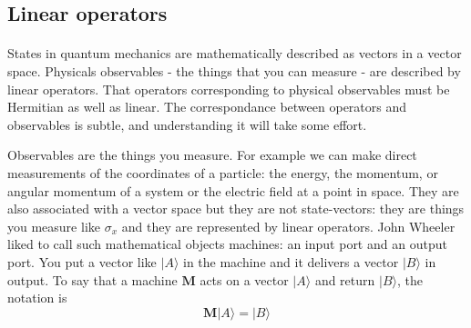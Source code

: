 \documentclass[a4paper,10pt]{article}
\begin{document}







\subsection{Linear operators}

\paragraph{} States in quantum mechanics are mathematically described as vectors in a vector space. Physicals observables - the things that you can measure - are described by linear operators. That operators corresponding to physical observables must be Hermitian as well as linear. The correspondance between operators and observables is subtle, and understanding it will take some effort.

Observables are the things you measure. For example we can make direct measurements of the coordinates of a particle: the energy, the momentum, or angular momentum of a system or the electric field at a point in space. They are also associated with a vector space but they are not state-vectors: they are things you measure like $\sigma_x$ and they are represented by linear operators. John Wheeler liked to call such mathematical objects machines: an input port and an output port. You put a vector like $|A\rangle$ in the machine and it delivers a vector $|B\rangle$ in output. To say that a machine $\mathbf{M}$ acts on a vector $|A\rangle$ and return $|B\rangle$, the notation is
$$\mathbf{M}|A\rangle = |B\rangle$$
\end{document}
